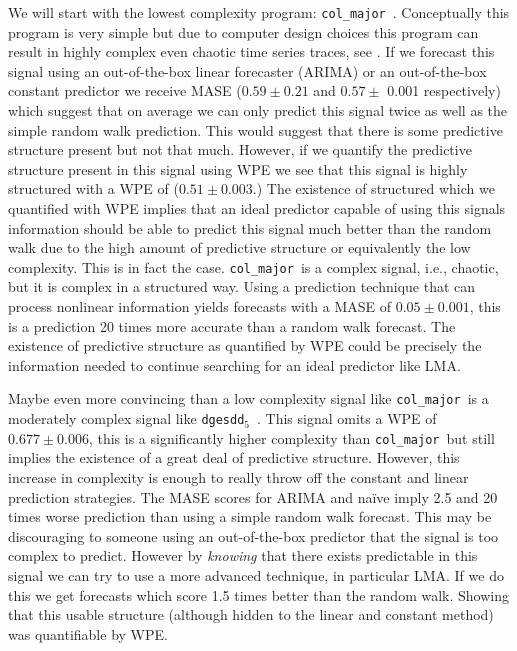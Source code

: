 \documentclass{article}
\newcommand{\svdfive}{{\tt dgesdd$_5$}~}
\newcommand{\col}{{\tt col\_major}~}
\begin{document}
We will start with the lowest complexity program: \col. Conceptually this program is very simple but due to computer design choices this program can result in highly complex even chaotic time series traces, see \cite{mytkowicz09}. If we forecast this signal using an out-of-the-box linear forecaster (ARIMA) or an out-of-the-box constant predictor we receive MASE ($0.59 \pm 0.21$ and $0.57 \pm$ 0.001 respectively) which suggest that on average we can only predict this signal twice as well as the simple random walk prediction. This would suggest that there is some predictive structure present but not that much. However, if we quantify the predictive structure present in this signal using WPE we see that this signal is highly structured with a WPE of ($0.51 \pm 0.003$.) The existence of structured which we quantified with WPE implies that an ideal predictor capable of using this signals information should be able to predict this signal much better than the random walk due to the high amount of predictive structure or equivalently the low complexity. This is in fact the case. \col is a complex signal, i.e., chaotic, but it is complex in a structured way. Using a prediction technique that can process nonlinear information yields forecasts with a MASE of $0.05 \pm 0.001$, this is a prediction 20 times more accurate than a random walk forecast. The existence of predictive structure as quantified by WPE could be precisely the information needed to continue searching for an ideal predictor like LMA. 

Maybe even more convincing than a low complexity signal like \col is a moderately complex signal like \svdfive. This signal omits a WPE of $0.677 \pm 0.006$, this is a significantly higher complexity than \col but still implies the existence of a great deal of predictive structure. However, this increase in complexity is enough to really throw off the constant and linear prediction strategies. The MASE scores for ARIMA and na\"ive imply 2.5 and 20 times worse prediction than using a simple random walk forecast. This may be discouraging to someone using an out-of-the-box predictor that the signal is too complex to predict. However by \emph{knowing} that there exists predictable  in this signal we can try to use a more advanced technique, in particular LMA. If we do this we get forecasts which score 1.5 times better than the random walk. Showing that this usable structure (although hidden to the linear and constant method) was quantifiable by WPE.
\end{document}
